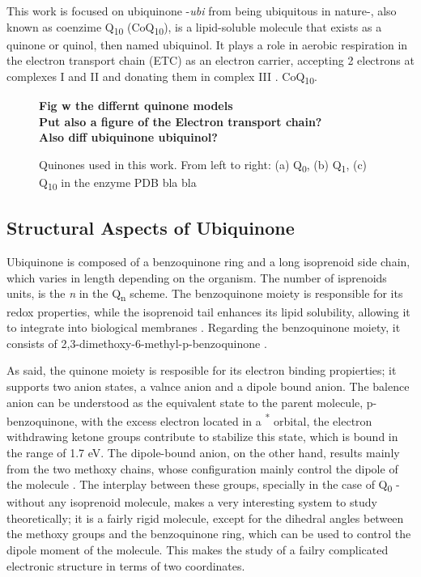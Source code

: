 This work is focused on ubiquinone -\textit{ubi} from being ubiquitous in nature-, also known as coenzime Q\textsubscript{10} (CoQ\textsubscript{10}), is a lipid-soluble molecule that exists as a quinone or quinol, then named ubiquinol. It plays a role in aerobic respiration in the electron transport chain (ETC) as an electron carrier, accepting 2 electrons at complexes I and II and donating them in complex III \cite{ernster1995biochemical}. CoQ\textsubscript{10}.

\begin{figure}[h]
  \centering
  \textbf{Fig w the differnt quinone models\\Put also a figure of the Electron transport chain?\\Also diff ubiquinone ubiquinol?}
  \caption[Quinone structures]{Quinones used in this work. From left to right: (a) Q\textsubscript{0}, (b) Q\textsubscript{1}, (c) Q\textsubscript{10} in the enzyme PDB bla bla}
  \label{fig:QuinoneTypes}
\end{figure}

\subsection{Structural Aspects of Ubiquinone}
Ubiquinone is composed of a benzoquinone ring and a long isoprenoid side chain, which varies in length depending on the organism. The number of isprenoids units, is the \textit{n} in the Q\textsubscript{n} scheme. The benzoquinone moiety is responsible for its redox properties, while the isoprenoid tail enhances its lipid solubility, allowing it to integrate into biological membranes \cite{ernster1995biochemical}. Regarding the benzoquinone moiety, it consists of 2,3-dimethoxy-6-methyl-p-benzoquinone \cite{ernster1995biochemical}.

As said, the quinone moiety is resposible for its electron binding propierties; it supports two anion states, a valnce anion and a dipole bound anion. The balence anion can be understood as the equivalent state to the parent molecule, p-benzoquinone, with the excess electron located in a \textpi \textsuperscript{*} orbital, the electron withdrawing ketone groups contribute to stabilize this state, which is bound in the range of 1.7 eV\cite{chen2024low}. The dipole-bound anion, on the other hand, results mainly from the two methoxy chains, whose configuration mainly control the dipole of the molecule \cite{ameixa2023parent}. The interplay between these groups, specially in the case of Q\textsubscript{0} - without any isoprenoid molecule, makes a very interesting system to study theoretically; it is a fairly rigid molecule, except for the dihedral angles between the methoxy groups and the benzoquinone ring, which can be used to control the dipole moment of the molecule. This makes the study of a failry  complicated electronic structure in terms of two coordinates.

